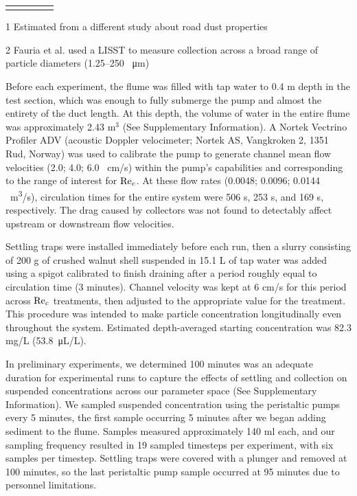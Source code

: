 \documentclass[geosciences,article,submit,moreauthors,pdftex]{Definitions/mdpi}
\begin{document}
\begin{table}[h]
\begin{threeparttable}
\begin{tabular}{lcccc}
\bottomrule
\vspace{-4mm}
\end{tabular}
\begin{tablenotes}
\footnotesize \item[1] Estimated from a different study about road dust properties \cite{mckenzie2008size} 
\vspace{2mm}
\footnotesize \item[2] Fauria et al. \cite{Fauria_2015} used a LISST to measure collection across a broad range of particle diameters (1.25--250 \SI{}{\micro\metre})
\end{tablenotes}
\end{threeparttable}
\label{tbl:parameters}
\end{table}

Before each experiment, the flume was filled with tap water to 0.4 m depth in the test section, which was enough to fully submerge the pump and almost the entirety of the duct length. At this depth, the volume of water in the entire flume was approximately 2.43 m$^3$ (See Supplementary Information).  A Nortek Vectrino Profiler ADV (acoustic Doppler velocimeter; Nortek AS, Vangkroken 2, 1351 Rud, Norway) was used to calibrate the pump to generate channel mean flow velocities (2.0; 4.0; 6.0 \SI{}{\centi\metre/\second}) within the pump's capabilities and corresponding to the range of interest for $\mathrm{Re}_c$. At these flow rates (0.0048; 0.0096; 0.0144 \SI{}{\metre\cubed/\second}), circulation times for the entire system were 506 s, 253 s, and 169 s, respectively. The drag caused by collectors was not found to detectably affect upstream or downstream flow velocities.

Settling traps were installed immediately before each run, then a slurry consisting of 200 g of crushed walnut shell suspended in 15.1 L of tap water was added using a spigot calibrated to finish draining after a period roughly equal to circulation time (3 minutes). Channel velocity was kept at 6 cm/s for this period across $\mathrm{Re}_c$ treatments, then adjusted to the appropriate value for the treatment. This procedure was intended to make particle concentration longitudinally even throughout the system. Estimated depth-averaged starting concentration was 82.3 mg/L (\SI{53.8}{\micro\liter/\liter}).

In preliminary experiments, we determined 100 minutes was an adequate duration for experimental runs to capture the effects of settling and collection on suspended concentrations across our parameter space (See Supplementary Information). We sampled suspended concentration using the peristaltic pumps every 5 minutes, the first sample occurring 5 minutes after we began adding sediment to the flume. Samples measured approximately 140 ml each, and our sampling frequency resulted in 19 sampled timesteps per experiment, with six samples per timestep. Settling traps were covered with a plunger and removed at 100 minutes, so the last peristaltic pump sample occurred at 95 minutes due to personnel limitations.
\end{document}
